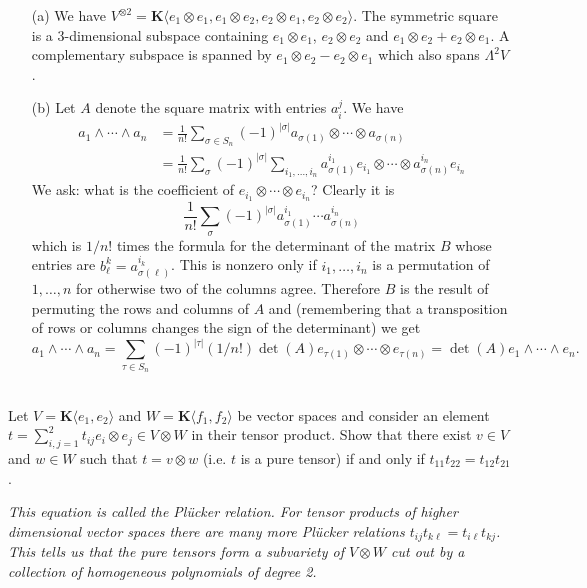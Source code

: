 \documentclass[12pt]{article}
\begin{document}
\begin{answer}
\begin{enumerate}
\item[(a)]
We have $V^{\otimes 2}=\mathbf{K}\langle e_1\otimes e_1,e_1\otimes e_2,e_2\otimes e_1,e_2\otimes e_2\rangle$. The symmetric square is a 3-dimensional subspace containing $e_1\otimes e_1$, $e_2\otimes e_2$ and $e_1\otimes e_2+e_2\otimes e_1$. A complementary subspace is spanned by $e_1\otimes e_2-e_2\otimes e_1$ which also spans $\Lambda^2V$.

\item[(b)] Let $A$ denote the square matrix with entries $a_i^j$. We have
\begin{align*}
a_1\wedge\cdots\wedge a_n&=\frac{1}{n!}\sum_{\sigma\in S_n}(-1)^{|\sigma|}a_{\sigma(1)}\otimes\cdots\otimes a_{\sigma(n)}\\
&=\frac{1}{n!}\sum_{\sigma}(-1)^{|\sigma|}\sum_{i_1,\ldots,i_n}a_{\sigma(1)}^{i_1}e_{i_1}\otimes\cdots\otimes a_{\sigma(n)}^{i_n}e_{i_n}
\end{align*}
We ask: what is the coefficient of $e_{i_1}\otimes\cdots\otimes e_{i_n}$? Clearly it is
\[\frac{1}{n!}\sum_{\sigma}(-1)^{|\sigma|}a^{i_1}_{\sigma(1)}\cdots a^{i_n}_{\sigma(n)}\]
which is $1/n!$ times the formula for the determinant of the matrix $B$ whose entries are $b^k_{\ell}=a^{i_k}_{\sigma(\ell)}$. This is nonzero only if $i_1,\ldots,i_n$ is a permutation of $1,\ldots,n$ for otherwise two of the columns agree. Therefore $B$ is the result of permuting the rows and columns of $A$ and (remembering that a transposition of rows or columns changes the sign of the determinant) we get
\[a_1\wedge\cdots\wedge a_n=\sum_{\tau\in S_n}(-1)^{|\tau|}(1/n!)\det(A)e_{\tau(1)}\otimes\cdots\otimes e_{\tau(n)}=\det(A)e_1\wedge\cdots\wedge e_n.\]
\end{enumerate}
\end{answer}
\newpage

\bigskip

\begin{question}\ \\
Let $V=\mathbf{K}\langle e_1,e_2\rangle$ and $W=\mathbf{K}\langle f_1,f_2\rangle$ be vector spaces and consider an element $t=\sum_{i,j=1}^2t_{ij}e_i\otimes e_j\in V\otimes W$ in their tensor product. Show that there exist $v\in V$ and $w\in W$ such that $t=v\otimes w$ (i.e. $t$ is a pure tensor) if and only if $t_{11}t_{22}=t_{12}t_{21}$.

{\em This equation is called the Pl\"{u}cker relation. For tensor products of higher dimensional vector spaces there are many more Pl\"{u}cker relations $t_{ij}t_{k\ell}=t_{i\ell}t_{kj}$. This tells us that the pure tensors form a subvariety of $V\otimes W$ cut out by a collection of homogeneous polynomials of degree 2.}
\end{question}
\end{document}
